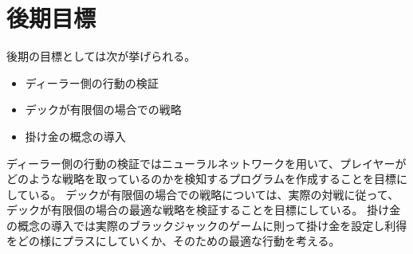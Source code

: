 \section{後期目標}
後期の目標としては次が挙げられる。

\begin{itemize}
\item ディーラー側の行動の検証
\item デックが有限個の場合での戦略
\item 掛け金の概念の導入
\end{itemize}

ディーラー側の行動の検証ではニューラルネットワークを用いて、プレイヤーがどのような戦略を取っているのかを検知するプログラムを作成することを目標にしている。
デックが有限個の場合での戦略については、実際の対戦に従って、デックが有限個の場合の最適な戦略を検証することを目標にしている。
掛け金の概念の導入では実際のブラックジャックのゲームに則って掛け金を設定し利得をどの様にプラスにしていくか、そのための最適な行動を考える。

